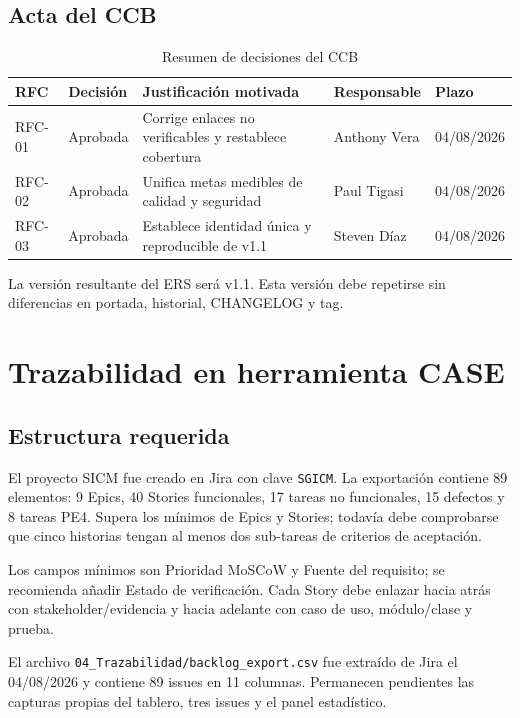 \documentclass[11pt,a4paper]{article}
\newcommand{\versionbaseline}{v1.1}
\begin{document}
	\subsection{Acta del CCB}
	\begin{table}[H]
		\centering
		\caption{Resumen de decisiones del CCB}
		\begin{tabularx}{\textwidth}{p{1.7cm}p{2.7cm}X p{2.5cm}p{2.2cm}}
			\toprule
			\textbf{RFC} & \textbf{Decisión} & \textbf{Justificación motivada} & \textbf{Responsable} & \textbf{Plazo}\\
			\midrule
			RFC-01 & Aprobada & Corrige enlaces no verificables y restablece cobertura & Anthony Vera & 04/08/2026\\
			RFC-02 & Aprobada & Unifica metas medibles de calidad y seguridad & Paul Tigasi & 04/08/2026\\
			RFC-03 & Aprobada & Establece identidad única y reproducible de v1.1 & Steven Díaz & 04/08/2026\\
			\bottomrule
		\end{tabularx}
	\end{table}
	
	La versión resultante del ERS será \versionbaseline. Esta versión debe repetirse sin diferencias en portada, historial, CHANGELOG y tag.
	
	\section{Trazabilidad en herramienta CASE}
	\subsection{Estructura requerida}
	El proyecto SICM fue creado en Jira con clave \texttt{SGICM}. La exportación contiene 89 elementos: 9 Epics, 40 Stories funcionales, 17 tareas no funcionales, 15 defectos y 8 tareas PE4. Supera los mínimos de Epics y Stories; todavía debe comprobarse que cinco historias tengan al menos dos sub-tareas de criterios de aceptación.
	
	Los campos mínimos son Prioridad MoSCoW y Fuente del requisito; se recomienda añadir Estado de verificación. Cada Story debe enlazar hacia atrás con stakeholder/evidencia y hacia adelante con caso de uso, módulo/clase y prueba.
	
	El archivo \texttt{04\_Trazabilidad/backlog\_export.csv} fue extraído de Jira el 04/08/2026 y contiene 89 issues en 11 columnas. Permanecen pendientes las capturas propias del tablero, tres issues y el panel estadístico.
	
\end{document}
